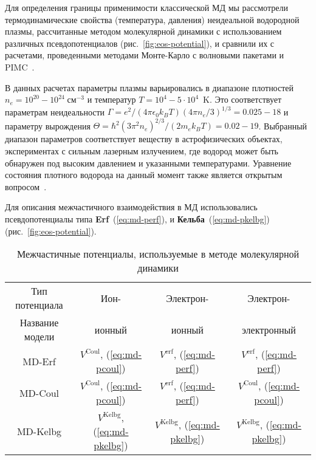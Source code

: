 Для определения границы применимости классической МД мы рассмотрели термодинамические свойства (температура, давления) неидеальной водородной плазмы, рассчитанные методом молекулярной динамики с использованием различных псевдопотенциалов (рис.~\ref{fig:eos-potential}), и сравнили их с расчетами, проведенными методами Монте-Карло с волновыми пакетами и  PIMC~\cite{filinov2004thermodynamic}.

В данных расчетах параметры плазмы варьировались в диапазоне плотностей  $n_e = 10^{20}-10^{24}\;\mbox{см}^{-3}$ и температур $T = 10^4 - 5 \cdot 10^4$~K. Это соответствует параметрам неидеальности $\Gamma = e^2/(4 \pi \epsilon_0 k^{}_BT) (4 \pi n_e/3)^{1/3} = 0.025 - 18$ и параметру вырождения  $\Theta
=\hbar^{2} (3 \pi^2 n_e)^{2/3} / (2m_e k^{}_B T) = 0.02 - 19$. Выбранный диапазон параметров соответствует веществу в астрофизических объектах, экспериментах с сильным лазерным излучением, где водород может быть обнаружен под высоким давлением и указанными температурами. Уравнение состояния плотного водорода на данный момент также является открытым вопросом~\cite{Pierleoni-PNAS16,Desjarlais-PRB08}.

Для описания межчастичного взаимодействия в МД использовались  псевдопотенциалы типа \textbf{Erf}~(\ref{eq:md-perf}), и \textbf{Кельба}~(\ref{eq:md-pkelbg}) (рис.~\ref{fig:eos-potential}). 
\begin{table}[h]\label{tab:interaction}
	\begin{center}
		\caption{\label{tab:potentials}Межчастичные потенциалы, используемые в методе молекулярной динамики}
		\begin{tabular}{|c|c|c|c|}
			\hline
			Тип потенциала & Ион- & Электрон- & Электрон-\\
			Название модели & ионный & ионный & электронный \\
			\hline
			MD-Erf & $V^\mathrm{Coul}$, (\ref{eq:md-pcoul}) & $V^\mathrm{erf}$, (\ref{eq:md-perf}) & $V^\mathrm{erf}$, (\ref{eq:md-perf}) \\
			MD-Coul & $V^\mathrm{Coul}$, (\ref{eq:md-pcoul}) & $V^\mathrm{erf}$, (\ref{eq:md-perf}) & $V^\mathrm{Coul}$, (\ref{eq:md-pcoul}) \\
			MD-Kelbg & $V^\mathrm{Kelbg}$, (\ref{eq:md-pkelbg}) & $V^\mathrm{Kelbg}$, (\ref{eq:md-pkelbg}) & $V^\mathrm{Kelbg}$, (\ref{eq:md-pkelbg}) \\
			\hline
		\end{tabular}
	\end{center}
\end{table}

